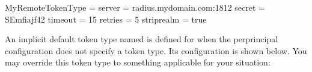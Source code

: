 \documentclass[letterpaper,10pt,english]{sphinxmanual}
\begin{document}
\begin{sphinxVerbatim}[commandchars=\\\{\}]
[otp]
    MyRemoteTokenType = \PYGZob{}
        server = radius.mydomain.com:1812
        secret = SEmfiajf42\PYGZdl{}
        timeout = 15
        retries = 5
        strip\PYGZus{}realm = true
    \PYGZcb{}
\end{sphinxVerbatim}

\sphinxAtStartPar
An implicit default token type named  is defined for when
the per\sphinxhyphen{}principal configuration does not specify a token type.  Its
configuration is shown below.  You may override this token type to
something applicable for your situation:

\begin{sphinxVerbatim}[commandchars=\\\{\}]
\PYG{p}{[}\PYG{p}{]}
      
          
\end{sphinxVerbatim}
\end{document}
